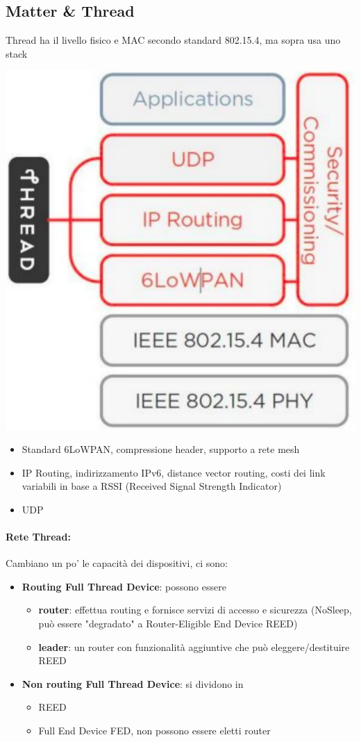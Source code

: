 \subsection{Matter \& Thread}
Thread ha il livello fisico e MAC secondo standard 802.15.4, ma sopra usa uno stack
\begin{center}
	\includegraphics[width=0.5\linewidth]{img/wpan/thread}
\end{center}
\begin{itemize}
	\item Standard 6LoWPAN, compressione header, supporto a rete mesh
	\item IP Routing, indirizzamento IPv6, distance vector routing, costi dei link variabili in base a RSSI (Received Signal Strength Indicator)
	\item UDP
\end{itemize}

\paragraph{Rete Thread:} Cambiano un po' le capacità dei dispositivi, ci sono: 
\begin{itemize}
	\item \textbf{Routing Full Thread Device}: possono essere
	\begin{itemize}
		\item \textbf{router}: effettua routing e fornisce servizi di accesso e sicurezza (NoSleep, può essere "degradato" a Router-Eligible End Device REED)
		\item \textbf{leader}: un router con funzionalità aggiuntive che può eleggere/destituire REED
	\end{itemize}
	\item \textbf{Non routing Full Thread Device}: si dividono in
	\begin{itemize}
		\item REED
		\item Full End Device FED, non possono essere eletti router
	\end{itemize}
\end{itemize}

